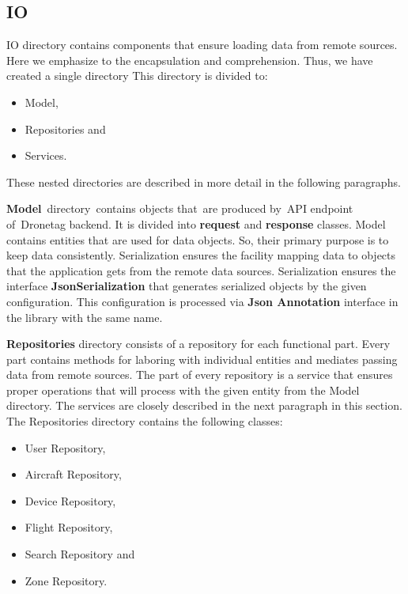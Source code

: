 \subsection{IO}\label{subsec:io}
IO directory contains components that ensure loading data from remote sources.
Here we emphasize to the encapsulation and comprehension.
Thus, we have created a single directory
This directory is divided to:
\begin{itemize}
    \item Model,
    \item Repositories and
    \item Services.
\end{itemize}
These nested directories are described in more detail in the following paragraphs.

\textbf{Model}~directory~contains objects that~are produced by~API endpoint of~Dronetag backend.
It is divided into \textbf{request} and \textbf{response} classes.
Model contains entities that are used for data objects.
So, their primary purpose is to keep data consistently.
Serialization ensures the facility mapping data to objects that the application gets from the remote data sources.
Serialization ensures the interface \textbf{JsonSerialization} that generates serialized objects by the given configuration.
This configuration is processed via \textbf{Json Annotation} interface in the library with the same name.

\textbf{Repositories} directory consists of a repository for each functional part.
Every part contains methods for laboring with individual entities and mediates passing data from remote sources.
The part of every repository is a service that ensures proper operations that will process with the given entity from the Model directory.
The services are closely described in the next paragraph in this section.
The Repositories directory contains the following classes:
\begin{itemize}
    \item User Repository,
    \item Aircraft Repository,
    \item Device Repository,
    \item Flight Repository,
    \item Search Repository and
    \item Zone Repository.
\end{itemize}

